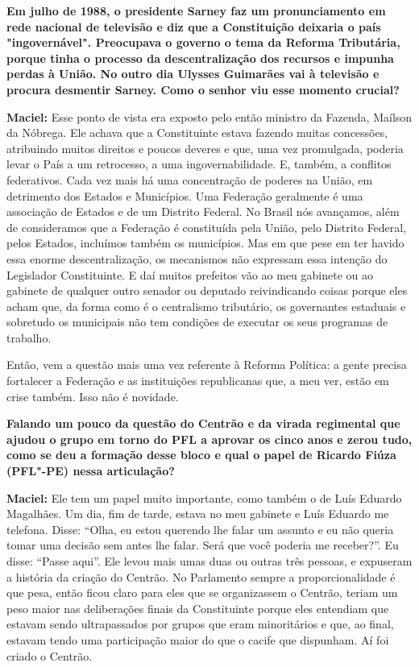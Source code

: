 \textbf{Em julho de 1988, o presidente Sarney faz um pronunciamento em
rede nacional de televisão e diz que a Constituição deixaria o país
"ingovernável". Preocupava o governo o tema da Reforma Tributária,
porque tinha o processo da descentralização dos recursos e impunha
perdas à União. No outro dia Ulysses Guimarães vai à televisão e procura
desmentir Sarney. Como o senhor viu esse momento crucial? }

\textbf{Maciel:} Esse ponto de vista era exposto pelo então ministro da
Fazenda, Maílson da Nóbrega. Ele achava que a Constituinte estava
fazendo muitas concessões, atribuindo muitos direitos e poucos deveres e
que, uma vez promulgada, poderia levar o País a um retrocesso, a uma
ingovernabilidade. E, também, a conflitos federativos. Cada vez mais há
uma concentração de poderes na União, em detrimento dos Estados e
Municípios. Uma Federação geralmente é uma associação de Estados e de um
Distrito Federal. No Brasil nós avançamos, além de consideramos que a
Federação é constituída pela União, pelo Distrito Federal, pelos
Estados, incluímos também os municípios. Mas em que pese em ter havido
essa enorme descentralização, os mecanismos não expressam essa intenção
do Legislador Constituinte. E daí muitos prefeitos vão ao meu gabinete
ou ao gabinete de qualquer outro senador ou deputado reivindicando
coisas porque eles acham que, da forma como é o centralismo tributário,
os governantes estaduais e sobretudo os municipais não tem condições de
executar os seus programas de trabalho.

Então, vem a questão mais uma vez referente à Reforma Política: a gente
precisa fortalecer a Federação e as instituições republicanas que, a meu
ver, estão em crise também. Isso não é novidade.

\textbf{Falando um pouco da questão do Centrão e da virada regimental
que ajudou o grupo em torno do PFL a aprovar os cinco anos e zerou tudo,
como se deu a formação desse bloco e qual o papel de Ricardo Fiúza
(PFL"-PE) nessa articulação? }

\textbf{Maciel:} Ele tem um papel muito importante, como também o de
Luís Eduardo Magalhães. Um dia, fim de tarde, estava no meu gabinete e
Luís Eduardo me telefona. Disse: ``Olha, eu estou querendo lhe falar um
assunto e eu não queria tomar uma decisão sem antes lhe falar. Será que
você poderia me receber?''. Eu disse: ``Passe aqui''. Ele levou mais
umas duas ou outras três pessoas, e expuseram a história da criação do
Centrão. No Parlamento sempre a proporcionalidade é que pesa, então
ficou claro para eles que se organizassem o Centrão, teriam um peso
maior nas deliberações finais da Constituinte porque eles entendiam que
estavam sendo ultrapassados por grupos que eram minoritários e que, ao
final, estavam tendo uma participação maior do que o cacife que
dispunham. Aí foi criado o Centrão.

